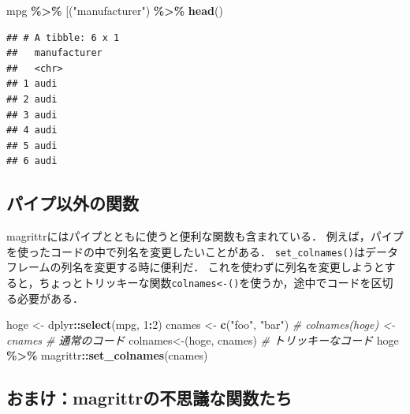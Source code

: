 \documentclass[
]{article}
\newenvironment{Shaded}{\begin{snugshade}}{\end{snugshade}}
\newcommand{\AttributeTok}[1]{\textcolor[rgb]{0.13,0.29,0.53}{#1}}
\newcommand{\CommentTok}[1]{\textcolor[rgb]{0.56,0.35,0.01}{\textit{#1}}}
\newcommand{\DecValTok}[1]{\textcolor[rgb]{0.00,0.00,0.81}{#1}}
\newcommand{\FunctionTok}[1]{\textcolor[rgb]{0.13,0.29,0.53}{\textbf{#1}}}
\newcommand{\NormalTok}[1]{#1}
\newcommand{\OtherTok}[1]{\textcolor[rgb]{0.56,0.35,0.01}{#1}}
\newcommand{\SpecialCharTok}[1]{\textcolor[rgb]{0.81,0.36,0.00}{\textbf{#1}}}
\newcommand{\StringTok}[1]{\textcolor[rgb]{0.31,0.60,0.02}{#1}}
\begin{document}
\begin{Shaded}
\begin{Highlighting}[]
\NormalTok{mpg }\SpecialCharTok{\%\textgreater{}\%} \StringTok{\textasciigrave{}}\AttributeTok{[}\StringTok{\textasciigrave{}}\NormalTok{(}\StringTok{"manufacturer"}\NormalTok{)  }\SpecialCharTok{\%\textgreater{}\%} \FunctionTok{head}\NormalTok{()}
\end{Highlighting}
\end{Shaded}

\begin{verbatim}
## # A tibble: 6 x 1
##   manufacturer
##   <chr>       
## 1 audi        
## 2 audi        
## 3 audi        
## 4 audi        
## 5 audi        
## 6 audi
\end{verbatim}

\hypertarget{ux30d1ux30a4ux30d7ux4ee5ux5916ux306eux95a2ux6570}{%
\subsection{パイプ以外の関数}\label{ux30d1ux30a4ux30d7ux4ee5ux5916ux306eux95a2ux6570}}

magrittrにはパイプとともに使うと便利な関数も含まれている．
例えば，パイプを使ったコードの中で列名を変更したいことがある．
\texttt{set\_colnames()}はデータフレームの列名を変更する時に便利だ．
これを使わずに列名を変更しようとすると，ちょっとトリッキーな関数\texttt{colnames\textless{}-()}を使うか，途中でコードを区切る必要がある．

\begin{Shaded}
\begin{Highlighting}[]
\NormalTok{hoge }\OtherTok{\textless{}{-}}\NormalTok{ dplyr}\SpecialCharTok{::}\FunctionTok{select}\NormalTok{(mpg, }\DecValTok{1}\SpecialCharTok{:}\DecValTok{2}\NormalTok{)}
\NormalTok{cnames }\OtherTok{\textless{}{-}} \FunctionTok{c}\NormalTok{(}\StringTok{"foo"}\NormalTok{, }\StringTok{"bar"}\NormalTok{)}
 \CommentTok{\# colnames(hoge) \textless{}{-} cnames      \# 通常のコード}
\StringTok{\textasciigrave{}}\AttributeTok{colnames\textless{}{-}}\StringTok{\textasciigrave{}}\NormalTok{(hoge, cnames)       }\CommentTok{\# トリッキーなコード}
\NormalTok{hoge }\SpecialCharTok{\%\textgreater{}\%} 
\NormalTok{  magrittr}\SpecialCharTok{::}\FunctionTok{set\_colnames}\NormalTok{(cnames)}
\end{Highlighting}
\end{Shaded}

\hypertarget{ux304aux307eux3051magrittrux306eux4e0dux601dux8b70ux306aux95a2ux6570ux305fux3061}{%
\subsection{おまけ：magrittrの不思議な関数たち}\label{ux304aux307eux3051magrittrux306eux4e0dux601dux8b70ux306aux95a2ux6570ux305fux3061}}
\end{document}
